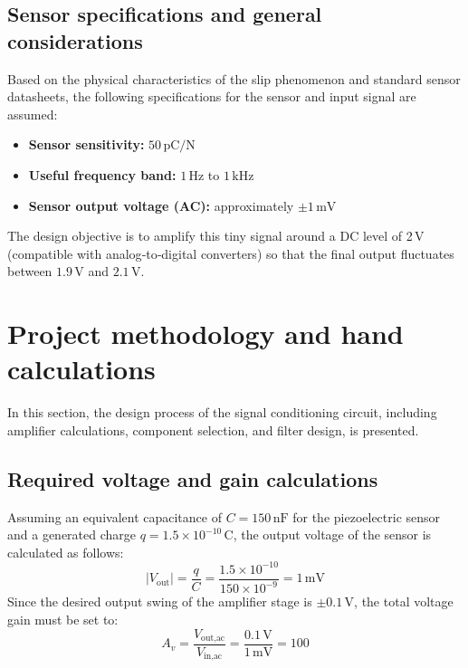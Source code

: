 \documentclass[12pt,a4paper]{article}
\begin{document}
\subsection{Sensor specifications and general considerations}
Based on the physical characteristics of the slip phenomenon and standard sensor datasheets, the following specifications for the sensor and input signal are assumed:
\begin{itemize}
    \item \textbf{Sensor sensitivity:} $50 \, \text{pC/N}$
    \item \textbf{Useful frequency band:} $1 \, \text{Hz}$ to $1 \, \text{kHz}$
    \item \textbf{Sensor output voltage (AC):} approximately $\pm 1 \, \text{mV}$
\end{itemize}
The design objective is to amplify this tiny signal around a DC level of 2 V (compatible with analog‑to‑digital converters) so that the final output fluctuates between $1.9 \, \text{V}$ and $2.1 \, \text{V}$.

\section{Project methodology and hand calculations}
\label{sec:calculations}

In this section, the design process of the signal conditioning circuit, including amplifier calculations, component selection, and filter design, is presented.

\subsection{Required voltage and gain calculations}
Assuming an equivalent capacitance of $C = 150 \, \text{nF}$ for the piezoelectric sensor and a generated charge $q = 1.5 \times 10^{-10} \, \text{C}$, the output voltage of the sensor is calculated as follows:
\begin{equation}
    |V_{\text{out}}| = \frac{q}{C} = \frac{1.5 \times 10^{-10}}{150 \times 10^{-9}} = 1 \, \text{mV}
\end{equation}
Since the desired output swing of the amplifier stage is $\pm 0.1 \, \text{V}$, the total voltage gain must be set to:
\begin{equation}
    A_v = \frac{V_{\text{out,ac}}}{V_{\text{in,ac}}} = \frac{0.1 \, \text{V}}{1 \, \text{mV}} = 100
\end{equation}
\end{document}
